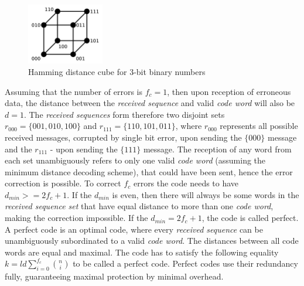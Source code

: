 \begin{figure}[H]
\centering
\includegraphics[width=0.3\textwidth]{figures/Hamming_distance.png}
\caption{Hamming distance cube for 3-bit binary numbers~\cite{web:hamming_dist}}
\label{fig:hamming_dist}
\end{figure}

Assuming that the number of errors is $f_c = 1$, then upon reception of erroneous data, the distance between the \textit{received sequence} and valid \textit{code word} will also be $d = 1$. The \textit{received sequences} form therefore two disjoint sets $r_{000}=\{001,010,100\}$ and $r_{111}=\{110,101,011\}$, where $r_{000}$ represents all possible received messages, corrupted by single bit error, upon sending the $\{000\}$ message and the $r_{111}$ - upon sending the $\{111\}$ message. The reception of any word from each set unambiguously refers to only one valid \textit{code word} (assuming the minimum distance decoding scheme), that could have been sent, hence the error correction is possible. To correct $f_c$ errors the code needs to have $d_{min} >= 2f_c+1$. If the $d_{min}$ is even, then there will always be some words in the \textit{received sequence set} that have equal distance to more than one \textit{code word}, making the correction impossible. If the $d_{min} = 2f_c+1$, the code is called perfect. A perfect code is an optimal code, where every \textit{received sequence} can be unambiguously subordinated to a valid \textit{code word}. The distances between all code words are equal and maximal. The code has to satisfy the following equality $k=ld\sum_{i=0}^{f_c} \binom{n}{i}$ to be called a perfect code. Perfect codes use their redundancy fully, guaranteeing maximal protection by minimal overhead.

